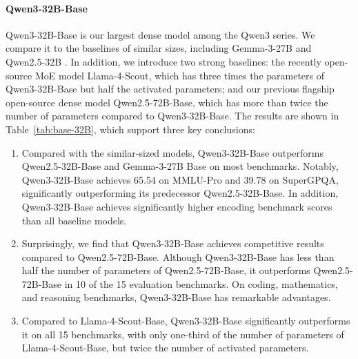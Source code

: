 \paragraph{Qwen3-32B-Base}
Qwen3-32B-Base is our largest dense model among the Qwen3 series. We compare it to the baselines of similar sizes, including Gemma-3-27B \citep{gemma3} and Qwen2.5-32B \citep{qwen2.5}. In addition, we introduce two strong baselines: the recently open-source MoE model Llama-4-Scout, which has three times the parameters of Qwen3-32B-Base but half the activated parameters; and our previous flagship open-source dense model Qwen2.5-72B-Base, which has more than twice the number of parameters compared to Qwen3-32B-Base.
The results are shown in Table~\ref{tab:base-32B}, which support three key conclusions:
\begin{enumerate}[label=(\arabic*)]
\item Compared with the similar-sized models, Qwen3-32B-Base outperforms Qwen2.5-32B-Base and Gemma-3-27B Base on most benchmarks. Notably, Qwen3-32B-Base achieves 65.54 on MMLU-Pro and 39.78 on SuperGPQA, significantly outperforming its predecessor Qwen2.5-32B-Base. In addition, Qwen3-32B-Base achieves significantly higher encoding benchmark scores than all baseline models.
\item Surprisingly, we find that Qwen3-32B-Base achieves competitive results compared to Qwen2.5-72B-Base. Although Qwen3-32B-Base has less than half the number of parameters of Qwen2.5-72B-Base, it outperforms Qwen2.5-72B-Base in 10 of the 15 evaluation benchmarks. On coding, mathematics, and reasoning benchmarks, Qwen3-32B-Base has remarkable advantages.
\item Compared to Llama-4-Scout-Base, Qwen3-32B-Base significantly outperforms it on all 15 benchmarks, with only one-third of the number of parameters of Llama-4-Scout-Base, but twice the number of activated parameters.
\end{enumerate}

